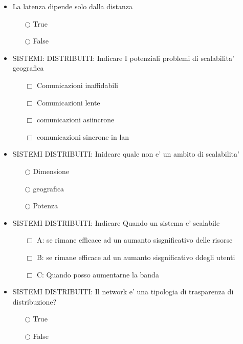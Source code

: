 \documentclass[10pt,twocolumn]{article}
\begin{document}
\begin{itemize}
    \item La latenza dipende solo dalla distanza
          \begin{itemize}
              \item[$\bigcirc$] True
              \item[$\bigcirc$] False
          \end{itemize}
\end{itemize}
\begin{itemize}
    \item SISTEMI: DISTRIBUITI: Indicare I potenziali problemi di scalabilita' geografica
          \begin{itemize}
              \item[$\Box$] Comunicazioni inaffidabili
              \item[$\Box$] Comunicazioni lente
              \item[$\Box$] comunicazioni asiincrone
              \item[$\Box$] comunicazioni sincrone in lan
          \end{itemize}
\end{itemize}
\begin{itemize}
    \item SISTEMI DISTRIBUITI: Inidcare quale non e' un ambito di scalabilita'
          \begin{itemize}
              \item[$\bigcirc$] Dimensione
              \item[$\bigcirc$] geografica
              \item[$\bigcirc$] Potenza
          \end{itemize}
\end{itemize}
\begin{itemize}
    \item SISTEMI DISTRIBUITI: Indicare Quando un sistema e' scalabile
          \begin{itemize}
              \item[$\Box$] A: se rimane efficace ad un aumanto sisgnificativo delle risorse
              \item[$\Box$] B: se rimane efficace ad un aumanto sisgnificativo ddegli utenti
              \item[$\Box$] C: Quando posso aumentarne la banda
          \end{itemize}
\end{itemize}
\begin{itemize}
    \item SISTEMI DISTRIBUITI: Il network e' una tipologia di trasparenza di distribuzione?
          \begin{itemize}
              \item[$\bigcirc$] True
              \item[$\bigcirc$] False
          \end{itemize}
\end{itemize}
\end{document}
